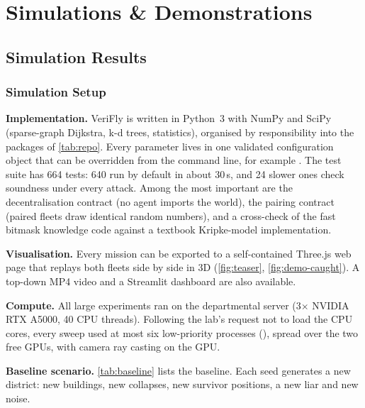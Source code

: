 \chapter[Results]{Simulations \& Demonstrations}
\label{cp:Results}

\parindent0pt

\section{Simulation Results}

\subsection{Simulation Setup}
\label{sec:setup}

\textbf{Implementation.} VeriFly is written in Python~3 with NumPy and SciPy (sparse-graph Dijkstra, k-d trees,
statistics), organised by responsibility into the packages of \autoref{tab:repo}. Every parameter lives in one validated configuration object that can be overridden from the
command line, for example . The test suite has 664 tests: 640 run by default in about 30\,s, and 24
slower ones check soundness under every attack. Among the most important are the decentralisation contract (no agent
imports the world), the pairing contract (paired fleets draw identical random numbers), and a cross-check of the fast
bitmask knowledge code against a textbook Kripke-model implementation.

\textbf{Visualisation.} Every mission can be exported to a self-contained Three.js web page that replays both fleets
side by side in 3D (\autoref{fig:teaser}, \autoref{fig:demo-caught}). A top-down MP4 video and a Streamlit dashboard
are also available.

\textbf{Compute.} All large experiments ran on the departmental server (3$\times$ NVIDIA RTX A5000, 40 CPU threads).
Following the lab's request not to load the CPU cores, every sweep used at most six low-priority processes
(), spread over the two free GPUs, with camera ray casting on the GPU.

\textbf{Baseline scenario.} \autoref{tab:baseline} lists the baseline. Each seed generates a new district: new
buildings, new collapses, new survivor positions, a new liar and new noise.

